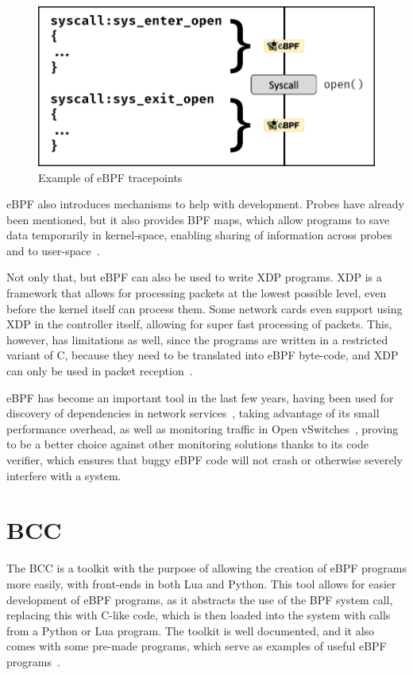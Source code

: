 \begin{figure}[htb]
   \centering
   \includegraphics[scale=.35]{syscall}
   \caption{Example of eBPF tracepoints}\label{fig:syscall}
\end{figure}

eBPF also introduces mechanisms to help with development. Probes have already
been mentioned, but it also provides BPF maps, which allow programs to save data
temporarily in kernel-space, enabling sharing of information across probes and
to user-space~\cite{lwm}.

Not only that, but eBPF can also be used to write \ac{XDP} programs. \ac{XDP} is
a framework that allows for processing packets at the lowest possible level,
even before the kernel itself can process them. Some network cards even support
using \ac{XDP} in the controller itself, allowing for super fast processing of
packets. This, however, has limitations as well, since the programs are written
in a restricted variant of C, because they need to be translated into eBPF
byte-code, and \ac{XDP} can only be used in packet reception~\cite{xdp}.

eBPF has become an important tool in the last few years, having been used for
discovery of dependencies in network services~\cite{ebpfeg1}, taking advantage
of its small performance overhead, as well as monitoring traffic in Open
vSwitches~\cite{ebpfeg2}, proving to be a better choice against other monitoring
solutions thanks to its code verifier, which ensures that buggy eBPF code will
not crash or otherwise severely interfere with a system.


\section{BCC}\label{sec:bcc}

The \ac{BCC} is a toolkit with the purpose of allowing the creation of eBPF
programs more easily, with front-ends in both Lua and Python. This tool allows
for easier development of eBPF programs, as it abstracts the use of the \ac{BPF}
system call, replacing this with C-like code, which is then loaded into the
system with calls from a Python or Lua program. The toolkit is well documented,
and it also comes with some pre-made programs, which serve as examples of useful
eBPF programs~\cite{gregg,bcc}.

